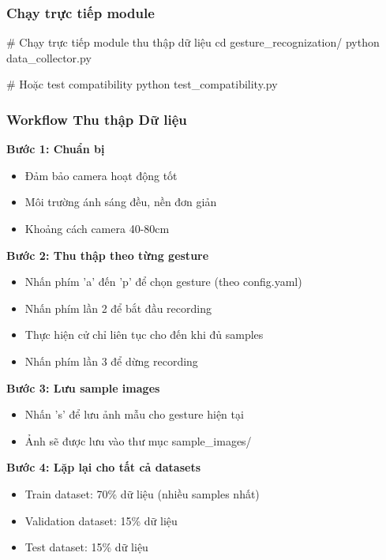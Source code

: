 \subsubsection{Chạy trực tiếp module}

\begin{aivncodebox}
\begin{python}
# Chạy trực tiếp module thu thập dữ liệu
cd gesture_recognization/
python data_collector.py

# Hoặc test compatibility
python test_compatibility.py
\end{python}
\end{aivncodebox}

\subsubsection{Workflow Thu thập Dữ liệu}

\textbf{Bước 1: Chuẩn bị}
\begin{itemize}
    \item Đảm bảo camera hoạt động tốt
    \item Môi trường ánh sáng đều, nền đơn giản
    \item Khoảng cách camera 40-80cm
\end{itemize}

\textbf{Bước 2: Thu thập theo từng gesture}
\begin{itemize}
    \item Nhấn phím 'a' đến 'p' để chọn gesture (theo config.yaml)
    \item Nhấn phím lần 2 để bắt đầu recording
    \item Thực hiện cử chỉ liên tục cho đến khi đủ samples
    \item Nhấn phím lần 3 để dừng recording
\end{itemize}

\textbf{Bước 3: Lưu sample images}
\begin{itemize}
    \item Nhấn 's' để lưu ảnh mẫu cho gesture hiện tại
    \item Ảnh sẽ được lưu vào thư mục sample\_images/
\end{itemize}

\textbf{Bước 4: Lặp lại cho tất cả datasets}
\begin{itemize}
    \item Train dataset: 70\% dữ liệu (nhiều samples nhất)
    \item Validation dataset: 15\% dữ liệu  
    \item Test dataset: 15\% dữ liệu
\end{itemize}

